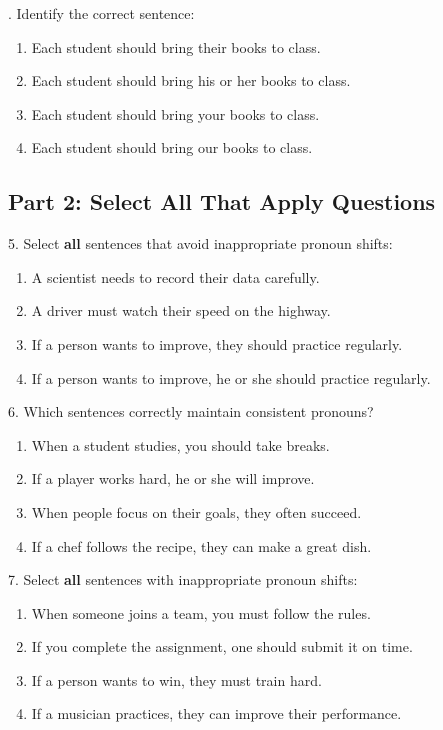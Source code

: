 \documentclass[12pt]{article}
\begin{document}
\vspace{1cm}
. Identify the correct sentence:  
\begin{enumerate}[label=\Alph*.]
    \item Each student should bring their books to class.  
    \item Each student should bring his or her books to class.  
    \item Each student should bring your books to class.  
    \item Each student should bring our books to class.  
\end{enumerate}



\subsection*{Part 2: Select All That Apply Questions}

5. Select \textbf{all} sentences that avoid inappropriate pronoun shifts:  
\begin{enumerate}[label=\Alph*.]
    \item A scientist needs to record their data carefully.  
    \item A driver must watch their speed on the highway.  
    \item If a person wants to improve, they should practice regularly.  
    \item If a person wants to improve, he or she should practice regularly.  
\end{enumerate}

\vspace{1cm}

6. Which sentences correctly maintain consistent pronouns?  
\begin{enumerate}[label=\Alph*.]
    \item When a student studies, you should take breaks.  
    \item If a player works hard, he or she will improve.  
    \item When people focus on their goals, they often succeed.  
    \item If a chef follows the recipe, they can make a great dish.  
\end{enumerate}

\vspace{1cm}

7. Select \textbf{all} sentences with inappropriate pronoun shifts:  
\begin{enumerate}[label=\Alph*.]
    \item When someone joins a team, you must follow the rules.  
    \item If you complete the assignment, one should submit it on time.  
    \item If a person wants to win, they must train hard.  
    \item If a musician practices, they can improve their performance.  
\end{enumerate}
\end{document}
